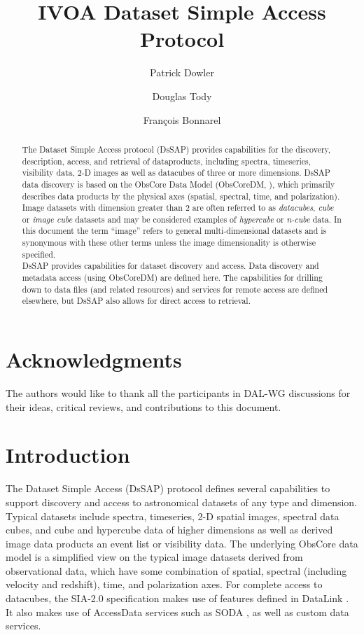 \documentclass[11pt,a4paper]{ivoa}
\title{IVOA Dataset Simple Access Protocol}
\author{Patrick Dowler}
\author{Douglas Tody}
\author{Fran\c cois Bonnarel}
\begin{document}
\begin{abstract}
The Dataset Simple  Access protocol (DsSAP) provides capabilities for the discovery, description, access, and retrieval of dataproducts, including spectra, timeseries, visibility data,   2-D images as well as datacubes of three or more dimensions.  DsSAP data discovery is based on the ObsCore Data Model (ObsCoreDM, \cite{std:OBSCORE}), which primarily describes data products by the physical axes (spatial, spectral, time, and polarization). Image datasets with dimension greater than 2 are often referred to as \textit{datacubes}, \textit{cube} or \textit{image cube} datasets and may be considered examples of \textit{hypercube} or \textit{n-cube} data.  In this document the term “image” refers to general multi-dimensional datasets and is synonymous with these other terms unless the image dimensionality is otherwise specified. \\
DsSAP provides capabilities for dataset discovery and access. Data discovery and  metadata access (using ObsCoreDM) are defined here. The capabilities for drilling down  to data files (and related resources) and services for remote access are defined elsewhere, but DsSAP also allows for direct access to retrieval. 
\end{abstract}
\section*{Acknowledgments}
The authors would like to thank all the participants in DAL-WG discussions  for their ideas, critical reviews, and contributions to this document.

\section{Introduction}
The Dataset Simple Access (DsSAP) protocol defines several capabilities to support discovery and access to astronomical datasets of any type and dimension.  Typical datasets include spectra, timeseries, 2-D spatial images, spectral data cubes, and cube and hypercube data of higher dimensions as well as derived image data products an event list or visibility data.  The underlying ObsCore data model is a simplified view on the typical image datasets derived from observational data, which have some combination of spatial, spectral (including velocity and redshift), time, and polarization axes.  
For complete access to datacubes, the SIA-2.0 specification  makes use of features defined in DataLink \citep{std:DataLink}. It also makes use of AccessData services such as SODA \citep{2017ivoa.spec.0517B}, as well as custom data services.
\end{document}
